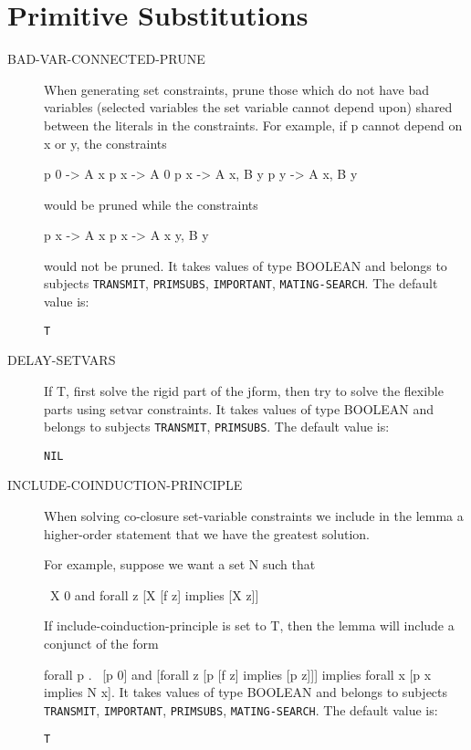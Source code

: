 \section{Primitive Substitutions}

\begin{description} 
\item[BAD-VAR-CONNECTED-PRUNE]  
When generating set constraints, prune those which do not
have bad variables (selected variables the set variable cannot depend upon)
shared between the literals in the constraints.  For example,
if p cannot depend on x or y, the constraints

   p 0 -> A x
   p x -> A 0
   p x -> A x, B y
   p y -> A x, B y

would be pruned while the constraints

   p x -> A x
   p x -> A x y, B y

would not be pruned.
It takes values of type BOOLEAN and belongs to subjects \texttt{TRANSMIT}, \texttt{PRIMSUBS}, \texttt{IMPORTANT}, \texttt{MATING-SEARCH}.  The default value is: \begin{lstlisting}
T
\end{lstlisting}

\item[DELAY-SETVARS]  
If T, first solve the rigid part of the jform,
then try to solve the flexible parts using setvar constraints.
It takes values of type BOOLEAN and belongs to subjects \texttt{TRANSMIT}, \texttt{PRIMSUBS}.  The default value is: \begin{lstlisting}
NIL
\end{lstlisting}

\item[INCLUDE-COINDUCTION-PRINCIPLE]  
When solving co-closure set-variable constraints we
include in the lemma a higher-order statement that we have
the greatest solution.

For example, suppose we want a set N such that

~X 0
and
forall z [X [f z] implies [X z]]

If include-coinduction-principle is set to T, then the lemma
will include a conjunct of the form

forall p . ~[p 0] and [forall z [p [f z] implies [p z]]]
       implies forall x [p x implies N x].
It takes values of type BOOLEAN and belongs to subjects \texttt{TRANSMIT}, \texttt{IMPORTANT}, \texttt{PRIMSUBS}, \texttt{MATING-SEARCH}.  The default value is: \begin{lstlisting}
T
\end{lstlisting}


\end{description}
